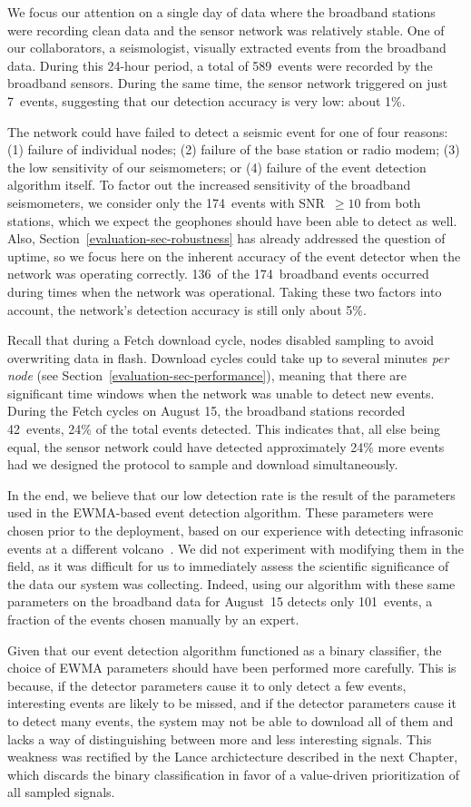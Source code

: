 We focus our attention on a single day of data where the broadband stations
were recording clean data and the sensor network was relatively stable. One
of our collaborators, a seismologist, visually extracted events from the
broadband data. During this 24-hour period, a total of 589~events were
recorded by the broadband sensors. During the same time, the sensor network
triggered on just 7~events, suggesting that our detection accuracy is very
low: about 1\%.

The network could have failed to detect a seismic event for one of four
reasons: (1) failure of individual nodes; (2) failure of the base station or
radio modem; (3) the low sensitivity of our seismometers; or (4) failure of
the event detection algorithm itself. To factor out the increased sensitivity
of the broadband seismometers, we consider only the 174~events with SNR~$\geq
10$ from both stations, which we expect the geophones should have been able
to detect as well. Also, Section~\ref{evaluation-sec-robustness} has already
addressed the question of uptime, so we focus here on the inherent accuracy
of the event detector when the network was operating correctly. 136~of the
174~broadband events occurred during times when the network was operational.
Taking these two factors into account, the network's detection accuracy is
still only about 5\%.

Recall that during a Fetch download cycle, nodes disabled sampling to avoid
overwriting data in flash. Download cycles could take up to several minutes
\textit{per node} (see Section~\ref{evaluation-sec-performance}), meaning
that there are significant time windows when the network was unable to detect
new events. During the Fetch cycles on August 15, the broadband stations
recorded 42~events, 24\% of the total events detected. This indicates that,
all else being equal, the sensor network could have detected approximately
24\% more events had we designed the protocol to sample and download
simultaneously.

In the end, we believe that our low detection rate is the result of the
parameters used in the EWMA-based event detection algorithm. These parameters
were chosen prior to the deployment, based on our experience with detecting
infrasonic events at a different volcano~\cite{volcano-ewsn05}. We did not
experiment with modifying them in the field, as it was difficult for us to
immediately assess the scientific significance of the data our system was
collecting. Indeed, using our algorithm with these same parameters on the
broadband data for August~15 detects only 101~events, a fraction of the
events chosen manually by an expert.

Given that our event detection algorithm functioned as a binary classifier,
the choice of EWMA parameters should have been performed more carefully. This
is because, if the detector parameters cause it to only detect a few events,
interesting events are likely to be missed, and if the detector parameters
cause it to detect many events, the system may not be able to download all of
them and lacks a way of distinguishing between more and less interesting
signals. This weakness was rectified by the Lance archictecture described in
the next Chapter, which discards the binary classification in favor of a
value-driven prioritization of all sampled signals.
